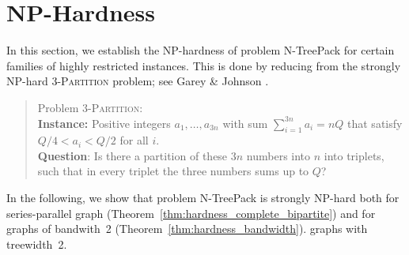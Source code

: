 \documentclass[runningheads]{llncs}
\newcommand{\xxxNTP}{{\sc N-TreePack}}
\begin{document}
\section{NP-Hardness}
\label{sec:hardness}
In this section, we establish the NP-hardness of problem {\xxxNTP} for certain families of
highly restricted instances. 
This is done by reducing from the strongly NP-hard \textsc{3-Partition} problem;
see Garey \& Johnson \cite{garey1979computers}. 
\begin{quote}
Problem \textsc{3-Partition}: 
\\
\textbf{Instance:} Positive integers $a_1,\ldots,a_{3n}$ with sum $\sum_{i=1}^{3n}a_i=nQ$ that satisfy 
$Q/4<a_i<Q/2$ for all $i$.
\\
\textbf{Question}: Is there a partition of these $3n$ numbers into $n$ into triplets, such that in 
every triplet the three numbers sums up to $Q$?  
\end{quote}
In the following, we show that problem {\xxxNTP} is strongly NP-hard both for series-parallel graph 
(Theorem~\ref{thm:hardness_complete_bipartite}) and for graphs of bandwith~2 (Theorem~\ref{thm:hardness_bandwidth}). 
graphs with treewidth~2.
\end{document}
